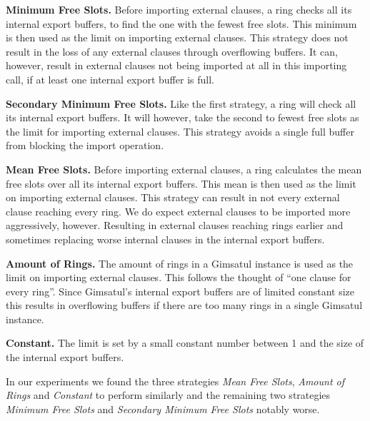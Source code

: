 \documentclass[12pt,a4paper,twoside]{scrartcl}
\numberwithin{equation}{section}
\begin{document}
\textbf{Minimum Free Slots.} Before importing external clauses, a ring checks all its internal export buffers, to find the one with the fewest free slots. This minimum is then used as the limit on importing external clauses.
This strategy does not result in the loss of any external clauses through overflowing buffers. It can, however, result in external clauses not being imported at all in this importing call, if at least one internal export buffer is full.

\textbf{Secondary Minimum Free Slots.} Like the first strategy, a ring will check all its internal export buffers. It will however, take the second to fewest free slots as the limit for importing external clauses. This strategy avoids a single full buffer from blocking the import operation.

\textbf{Mean Free Slots.} Before importing external clauses, a ring calculates the mean free slots over all its internal export buffers. This mean is then used as the limit on importing external clauses.
This strategy can result in not every external clause reaching every ring. We do expect external clauses to be imported more aggressively, however. Resulting in external clauses reaching rings earlier and sometimes replacing worse internal clauses in the internal export buffers.

\textbf{Amount of Rings.} The amount of rings in a Gimsatul instance is used as the limit on importing external clauses.
This follows the thought of ``one clause for every ring''. Since Gimsatul's internal export buffers are of limited constant size this results in overflowing buffers if there are too many rings in a single Gimsatul instance.

\textbf{Constant.} The limit is set by a small constant number between 1 and the size of the internal export buffers.

In our experiments we found the three strategies \textit{Mean Free Slots}, \textit{Amount of Rings} and \textit{Constant} to perform similarly and the remaining two strategies \textit{Minimum Free Slots} and \textit{Secondary Minimum Free Slots} notably worse.
\end{document}
